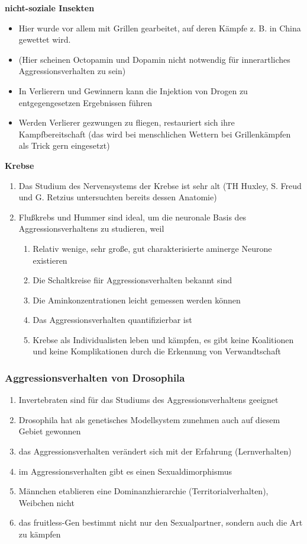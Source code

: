 \textbf{nicht-soziale Insekten}
\begin{itemize}
	\item Hier wurde vor allem mit Grillen gearbeitet, auf deren Kämpfe z. B. in China gewettet wird.
	\item (Hier scheinen Octopamin und Dopamin nicht notwendig für innerartliches Aggressionsverhalten zu sein)
	\item In Verlierern und Gewinnern kann die Injektion von Drogen zu entgegengesetzen Ergebnissen führen
	\item Werden Verlierer gezwungen zu fliegen, restauriert sich ihre Kampfbereitschaft (das wird bei menschlichen Wettern bei Grillenkämpfen als Trick gern eingesetzt)
\end{itemize}

\textbf{Krebse}
\begin{enumerate}
	\item Das Studium des Nervensystems der Krebse ist sehr alt (TH Huxley, S. Freud und G. Retzius untersuchten bereits dessen Anatomie)
	\item Flußkrebs und Hummer sind ideal, um die neuronale Basis des Aggressionsverhaltens zu studieren, weil
\begin{enumerate}
		\item Relativ wenige, sehr große, gut charakterisierte aminerge Neurone existieren
		\item Die Schaltkreise fiir Aggressionsverhalten bekannt sind
		\item Die Aminkonzentrationen leicht gemessen werden können
		\item Das Aggressionsverhalten quantifizierbar ist
		\item Krebse als Individualisten leben und kämpfen, es gibt keine Koalitionen und keine Komplikationen durch die Erkennung von Verwandtschaft
	\end{enumerate}
\end{enumerate}

\subsubsection{Aggressionsverhalten von Drosophila}
\begin{enumerate}
	\item Invertebraten sind für das Studiums des Aggressionsverhaltens geeignet
	\item Drosophila hat als genetisches Modellsystem zunehmen auch auf diesem Gebiet gewonnen
	\item das Aggressionsverhalten verändert sich mit der Erfahrung (Lernverhalten)
	\item im Aggressionsverhalten gibt es einen Sexualdimorphismus
	\item Männchen etablieren eine Dominanzhierarchie (Territorialverhalten), Weibchen nicht
	\item das fruitless-Gen bestimmt nicht nur den Sexualpartner, sondern auch die Art zu kämpfen
\end{enumerate}